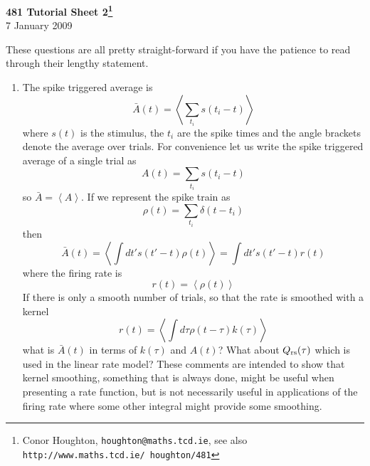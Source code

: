 \documentclass[12pt]{article}
\begin{document}
\begin{center}
{\bf 481 Tutorial Sheet 2\footnote{Conor Houghton, {\tt houghton@maths.tcd.ie}, see also {\tt http://www.maths.tcd.ie/ houghton/481}}}\\[1cm]{} 7 January 2009
\end{center}


These questions are all pretty straight-forward if you have the patience to read through their lengthy statement.

\begin{enumerate}
\item The spike triggered average is
\begin{equation}
\bar{A}(t)=\left<\sum_{t_i}{s(t_i-t)}\right>
\end{equation}
where $s(t)$ is the stimulus, the $t_i$ are the spike times and the angle brackets denote the average over trials. For convenience let us write the spike triggered average of a single trial as
\begin{equation}
A(t)=\sum_{t_i}{s(t_i-t)}
\end{equation}
so $\bar{A}=\left<A\right>$. If we represent the spike train as
\begin{equation}
\rho(t)=\sum_{t_i}{\delta(t-t_i)}
\end{equation}
then 
\begin{equation}
\bar{A}(t)=\left<\int{dt' s(t'-t)\rho(t)}\right>=\int{dt' s(t'-t)r(t)}
\end{equation}
where the firing rate is 
\begin{equation}
r(t)=\left<\rho(t)\right>
\end{equation}
If there is only a smooth number of trials, so that the rate is smoothed with a kernel
\begin{equation}
r(t)=\left<\int d\tau \rho(t-\tau)k(\tau)\right>
\end{equation}
what is $\bar{A}(t)$ in terms of $k(\tau)$ and $A(t)$? What about
$Q_{\mbox{\scriptsize{rs}}}(\tau)$ which is used in the linear rate model? These comments
are intended to show that kernel smoothing, something that is always
done, might be useful when presenting a rate function, but is not
necessarily useful in applications of the firing rate where some other
integral might provide some smoothing.


\end{enumerate}
\end{document}
